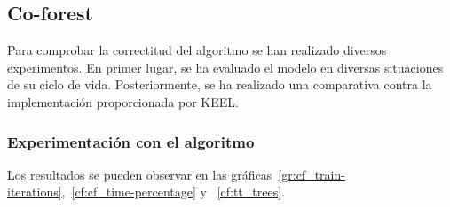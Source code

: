 \subsection{Co-forest}

Para comprobar la correctitud del algoritmo se han realizado diversos experimentos. En primer lugar, se ha evaluado el modelo en diversas situaciones de su ciclo de vida. Posteriormente, se ha realizado una comparativa contra la implementación proporcionada por KEEL.

\subsubsection{Experimentación con el algoritmo}

Los resultados se pueden observar en las gráficas~\ref{gr:cf_train-iterations},~\ref{cf:cf_time-percentage} y ~\ref{cf:tt_trees}.


